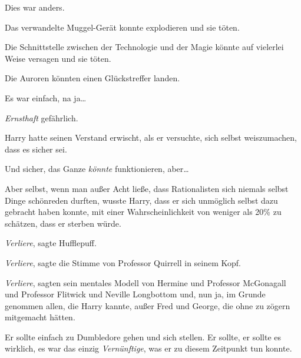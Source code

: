 Dies war anders.

Das verwandelte Muggel-Gerät konnte explodieren und sie töten.

Die Schnittstelle zwischen der Technologie und der Magie könnte auf vielerlei Weise versagen und sie töten.

Die Auroren könnten einen Glückstreffer landen.

Es war einfach, na ja…

\emph{Ernsthaft} gefährlich.

Harry hatte seinen Verstand erwischt, als er versuchte, sich selbst weiszumachen, dass es sicher sei.

Und sicher, das Ganze \emph{könnte} funktionieren, aber…

Aber selbst, wenn man außer Acht ließe, dass Rationalisten sich niemals selbst Dinge schönreden durften, wusste Harry, dass er sich unmöglich selbst dazu gebracht haben konnte, mit einer Wahrscheinlichkeit von weniger als 20\% zu schätzen, dass er sterben würde.

\emph{Verliere}, sagte Hufflepuff.

\emph{Verliere}, sagte die Stimme von Professor Quirrell in seinem Kopf.

\emph{Verliere}, sagten sein mentales Modell von Hermine und Professor McGonagall und Professor Flitwick und Neville Longbottom und, nun ja, im Grunde genommen allen, die Harry kannte, außer Fred und George, die ohne zu zögern mitgemacht hätten.

Er sollte einfach zu Dumbledore gehen und sich stellen. Er sollte, er sollte es wirklich, es war das einzig \emph{Vernünftige}, was er zu diesem Zeitpunkt tun konnte.

